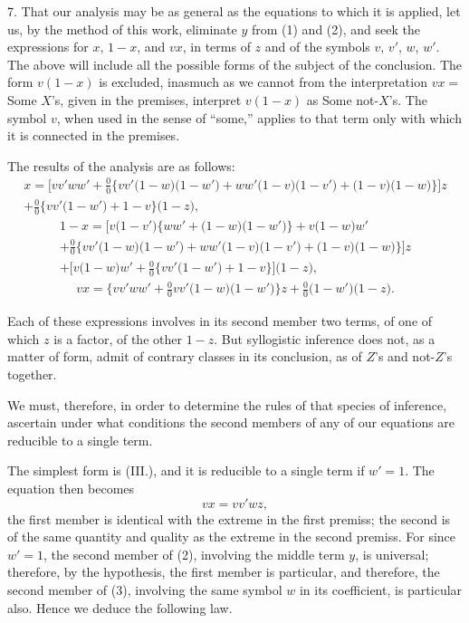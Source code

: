 \documentclass[oneside]{book}
\begin{document}
7. That our analysis may be as general as the equations to
which it is applied, let us, by the method of this work, eliminate
$y$ from (1) and (2), and seek the expressions for $x$, $1-x$, and
$vx$, in terms of $z$ and of the symbols $v$, $v'$, $w$, $w'$. The above will
include all the possible forms of the subject of the conclusion.
The form $v(1-x)$ is excluded, inasmuch as we cannot from the
interpretation $vx =$ Some $X$'s, given in the premises, interpret
$v(1-x)$ as Some not-$X$'s. The symbol $v$, when used in the sense
of ``some,'' applies to that term only with which it is connected
in the premises.

The results of the analysis are as follows:
\begin{multline*}
\tag{I.}
  x= \bigl[vv'ww' + \frac{0}{0}\{
   vv'\bigl(1-w\bigr) \bigl(1-w'\bigr)
 + ww'\bigl(1-v\bigr) \bigl(1-v'\bigr)
 +    \bigl(1-v\bigr) \bigl(1-w\bigr)\}\bigr]z\\
  + \frac{0}{0}\{vv'\bigl(1-w'\bigr) + 1-v\} \bigl(1-z\bigr),
\end{multline*}
\begin{multline*}
\tag{II.}
  1-x = \bigl[
   v\bigl(1-v'\bigr) \{ww' + \bigl(1-w\bigr) \bigl(1-w'\bigr)\}
 + v\bigl(1-w\bigr)w'\\
+ \frac{0}{0}\{
   vv'\bigl(1-w\bigr) \bigl(1-w'\bigr)
 + ww'\bigl(1-v\bigr) \bigl(1-v'\bigr)
 + \bigl(1-v\bigr) \bigl(1-w\bigr) \} \bigr]z\\
  +\bigl[v\bigl(1-w\bigr)w'
 + \frac{0}{0}\{vv'\bigl(1-w'\bigr) + 1-v\} \bigr] \bigl(1-z\bigr),
\end{multline*}
\begin{multline*}
\tag{III.}
  vx = \{vv'ww' + \frac{0}{0}vv'\bigl(1-w\bigr) \bigl(1-w'\bigr)\}z
 + \frac{0}{0}\bigl(1-w'\bigr) \bigl(1-z\bigr).
\end{multline*}

Each of these expressions involves in its second member two
terms, of one of which $z$ is a factor, of the other $1-z$. But
syllogistic inference does not, as a matter of form, admit of contrary
classes in its conclusion, as of $Z$'s and not-$Z$'s together.

We must, therefore, in order to determine the rules of that
species of inference, ascertain under what conditions the second
members of any of our equations are reducible to a single term.

The simplest form is (III.), and it is reducible to a single
term if $w' = 1$. The equation then becomes
\[  \tag{3}
  vx = vv'wz,
\]
the first member is identical with the extreme in the first premiss;
the second is of the same quantity and quality as the extreme
in the second premiss. For since $w' = 1$, the second member of
(2), involving the middle term $y$, is universal; therefore, by the
hypothesis, the first member is particular, and therefore, the second
member of (3), involving the same symbol $w$ in its coefficient,
is particular also. Hence we deduce the following law.
\end{document}
